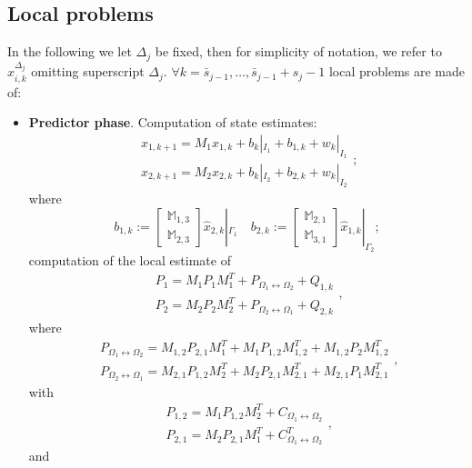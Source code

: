\documentclass[smallcondensed]{svjour3}
\begin{document}
\subsection{Local problems}
In the following we let  $\Delta_{j}$ be fixed, then for simplicity of notation, we refer to $\widehat{x}_{i,k}^{\Delta_{j}}$ omitting superscript $\Delta_{j}$.
  $\forall k=\bar{s}_{j-1},\ldots,\bar{s}_{j-1}+s_{j}-1$ local problems are made of:
\begin{itemize}
\item {\bf Predictor phase}. Computation of  state estimates:
\begin{equation}\label{stimapredetta_DD}
\begin{array}{ll}
x_{1,k+1}=M_{1}\widehat{x}_{1,k}+b_{k}|_{I_{1}}+b_{1,k}+w_k|_{I_{1}}\\
x_{2,k+1}=M_{2}\widehat{x}_{2,k}+b_{k}|_{I_{2}}+b_{2,k}+w_k|_{I_{2}}
\end{array};
 \end{equation}
 where 
\begin{equation}\label{b_k}
    b_{1,k}:=\left[\begin{array}{ll} \mathbb{M}_{1,3}\\ \mathbb{M}_{2,3}\end{array}\right]\widehat{x}_{2,k}|_{\Gamma_{1}} \quad b_{2,k}:=\left[\begin{array}{ll} \mathbb{M}_{2,1}\\ \mathbb{M}_{3,1}\end{array}\right]\widehat{x}_{1,k}|_{\Gamma_{2}};
\end{equation}
computation of  the local estimate of 
\begin{equation}\label{predictedmatrix_DD}
\begin{array}{ll}
P_{1}=M_{1}P_{1}M_{1}^{T}+P_{\Omega_{1}\leftrightarrow \Omega_{2}}+Q_{1,k}\\
P_{2}=M_{2}P_{2}M_{2}^{T}+P_{\Omega_{2}\leftrightarrow \Omega_{1}} +Q_{2,k}
\end{array},
\end{equation}
where
\begin{equation}\label{matP_in}
\begin{array}{ll}
P_{\Omega_{1}\leftrightarrow \Omega_{2}} =M_{1,2}P_{2,1}M_{1}^{T}+M_{1}P_{1,2}M_{1,2}^{T}+M_{1,2}P_{2}M_{1,2}^{T}\\
P_{\Omega_{2}\leftrightarrow \Omega_{1}} =M_{2,1}P_{1,2}M_{2}^{T}+M_{2}P_{2,1}M_{2,1}^{T}+M_{2,1}P_{1}M_{2,1}^{T}
\end{array},
\end{equation}
with
\begin{equation}\label{matP}
\begin{array}{ll}
P_{1,2}=M_{1}P_{1,2}M_{2}^{T}+C_{\Omega_{1}\leftrightarrow \Omega_{2}}\\
P_{2,1}=M_{2}P_{2,1}M_{1}^{T}+C_{\Omega_{1}\leftrightarrow \Omega_{2}}^{T}
\end{array},
\end{equation}
and


\end{itemize}
\end{document}
